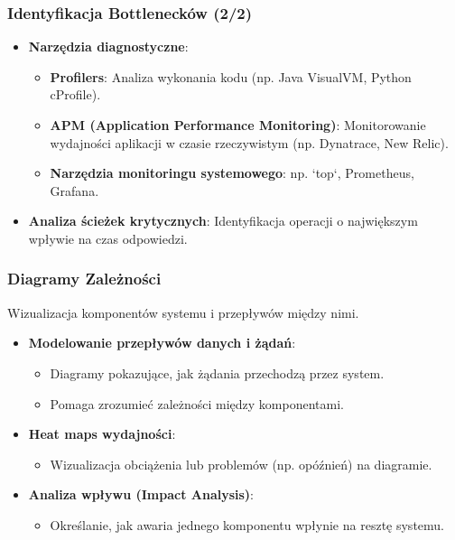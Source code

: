 \documentclass[aspectratio=169,xcolor=table]{beamer}
\begin{document}
\begin{frame}
  \frametitle{Identyfikacja Bottlenecków (2/2)}
  \begin{itemize}
    \item \textbf{Narzędzia diagnostyczne}:
        \begin{itemize}
            \item \textbf{Profilers}: Analiza wykonania kodu (np. Java VisualVM, Python cProfile).
            \item \textbf{APM (Application Performance Monitoring)}: Monitorowanie wydajności aplikacji w czasie rzeczywistym (np. Dynatrace, New Relic).
            \item \textbf{Narzędzia monitoringu systemowego}: np. `top`, Prometheus, Grafana.
        \end{itemize}
    \item \textbf{Analiza ścieżek krytycznych}: Identyfikacja operacji o największym wpływie na czas odpowiedzi.
  \end{itemize}
\end{frame}

\begin{frame}
  \frametitle{Diagramy Zależności}
  Wizualizacja komponentów systemu i przepływów między nimi.
  \begin{itemize}
    \item \textbf{Modelowanie przepływów danych i żądań}:
        \begin{itemize}
            \item Diagramy pokazujące, jak żądania przechodzą przez system.
            \item Pomaga zrozumieć zależności między komponentami.
        \end{itemize}
    \item \textbf{Heat maps wydajności}:
        \begin{itemize}
            \item Wizualizacja obciążenia lub problemów (np. opóźnień) na diagramie.
        \end{itemize}
    \item \textbf{Analiza wpływu (Impact Analysis)}:
        \begin{itemize}
            \item Określanie, jak awaria jednego komponentu wpłynie na resztę systemu.
        \end{itemize}
  \end{itemize}
\end{frame}
\end{document}
